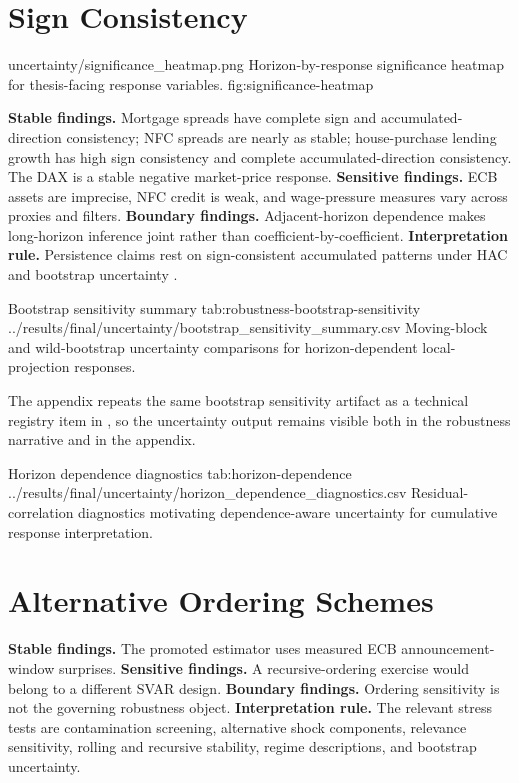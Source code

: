 \section{Sign Consistency}

\thesisfigure
  {uncertainty/significance_heatmap.png}
  {Horizon-by-response significance heatmap for thesis-facing response variables.}
  {fig:significance-heatmap}

\noindent\textbf{Stable findings.} Mortgage spreads have complete sign and accumulated-direction consistency; NFC spreads are nearly as stable; house-purchase lending growth has high sign consistency and complete accumulated-direction consistency. The DAX is a stable negative market-price response. \textbf{Sensitive findings.} ECB assets are imprecise, NFC credit is weak, and wage-pressure measures vary across proxies and filters. \textbf{Boundary findings.} Adjacent-horizon dependence makes long-horizon inference joint rather than coefficient-by-coefficient. \textbf{Interpretation rule.} Persistence claims rest on sign-consistent accumulated patterns under HAC and bootstrap uncertainty \parencite{Jorda2005,NeweyWest1987}.

\artifacttable
  {Bootstrap sensitivity summary}
  {tab:robustness-bootstrap-sensitivity}
  {../results/final/uncertainty/bootstrap_sensitivity_summary.csv}
  {Moving-block and wild-bootstrap uncertainty comparisons for horizon-dependent local-projection responses.}

The appendix repeats the same bootstrap sensitivity artifact as a technical registry item in , so the uncertainty output remains visible both in the robustness narrative and in the appendix.

\artifacttable
  {Horizon dependence diagnostics}
  {tab:horizon-dependence}
  {../results/final/uncertainty/horizon_dependence_diagnostics.csv}
  {Residual-correlation diagnostics motivating dependence-aware uncertainty for cumulative response interpretation.}

\section{Alternative Ordering Schemes}

\noindent\textbf{Stable findings.} The promoted estimator uses measured ECB announcement-window surprises. \textbf{Sensitive findings.} A recursive-ordering exercise would belong to a different SVAR design. \textbf{Boundary findings.} Ordering sensitivity is not the governing robustness object. \textbf{Interpretation rule.} The relevant stress tests are contamination screening, alternative shock components, relevance sensitivity, rolling and recursive stability, regime descriptions, and bootstrap uncertainty.
